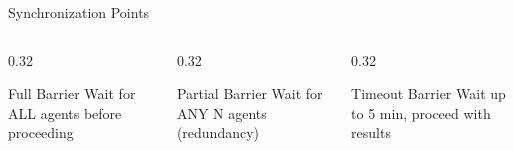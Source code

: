 \documentclass[aspectratio=169,11pt]{beamer}
\begin{document}
\begin{frame}{Synchronization Points}
    \vspace{0.3cm}
    \begin{columns}[T]
        \begin{column}{0.32\textwidth}
            \begin{block}{Full Barrier}
                \footnotesize
                Wait for ALL agents before proceeding
            \end{block}
        \end{column}
        \begin{column}{0.32\textwidth}
            \begin{block}{Partial Barrier}
                \footnotesize
                Wait for ANY N agents (redundancy)
            \end{block}
        \end{column}
        \begin{column}{0.32\textwidth}
            \begin{block}{Timeout Barrier}
                \footnotesize
                Wait up to 5 min, proceed with results
            \end{block}
        \end{column}
    \end{columns}
\end{frame}
\end{document}
